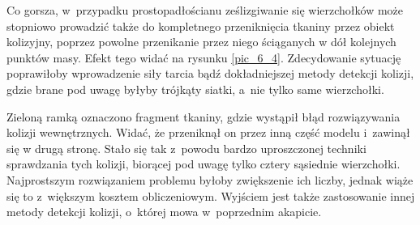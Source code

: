 		
		Co gorsza, w~przypadku prostopadłościanu ześlizgiwanie się wierzchołków może stopniowo prowadzić także do kompletnego przeniknięcia tkaniny przez obiekt kolizyjny, poprzez powolne przenikanie przez niego ściąganych w dół kolejnych punktów masy. Efekt tego widać na rysunku \ref{pic_6_4}. Zdecydowanie sytuację poprawiłoby wprowadzenie siły tarcia bądź dokładniejszej metody detekcji kolizji, gdzie brane pod uwagę byłyby trójkąty siatki, a~nie tylko same wierzchołki.
		
		Zieloną ramką oznaczono fragment tkaniny, gdzie wystąpił błąd rozwiązywania kolizji wewnętrznych. Widać, że przeniknął on przez inną część modelu i~zawinął się w drugą stronę. Stało się tak z~powodu bardzo uproszczonej techniki sprawdzania tych kolizji, biorącej pod uwagę tylko cztery sąsiednie wierzchołki. Najprostszym rozwiązaniem problemu byłoby zwiększenie ich liczby, jednak wiąże się to z~większym kosztem obliczeniowym. Wyjściem jest także zastosowanie innej metody detekcji kolizji, o~której mowa w~poprzednim akapicie.
			
			
			
